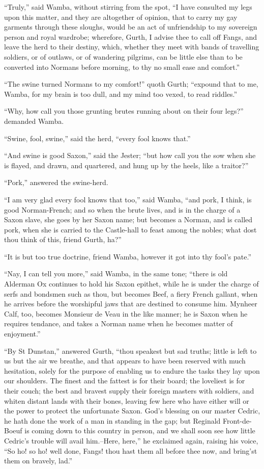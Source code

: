 ``Truly,'' said Wamba, without stirring from the spot, ``I have
consulted my legs upon this matter, and they are altogether of opinion,
that to carry my gay garments through these sloughs, would be an act of
unfriendship to my sovereign person and royal wardrobe; wherefore,
Gurth, I advise thee to call off Fangs, and leave the herd to their
destiny, which, whether they meet with bands of travelling soldiers, or
of outlaws, or of wandering pilgrims, can be little else than to be
converted into Normans before morning, to thy no small ease and
comfort.''

``The swine turned Normans to my comfort!'' quoth Gurth; ``expound that
to me, Wamba, for my brain is too dull, and my mind too vexed, to read
riddles.''

``Why, how call you those grunting brutes running about on their four
legs?'' demanded Wamba.

``Swine, fool, swine,'' said the herd, ``every fool knows that.''

``And swine is good Saxon,'' said the Jester; ``but how call you the sow
when she is flayed, and drawn, and quartered, and hung up by the heels,
like a traitor?''

``Pork,'' answered the swine-herd.

``I am very glad every fool knows that too,'' said Wamba, ``and pork, I
think, is good Norman-French; and so when the brute lives, and is in the
charge of a Saxon slave, she goes by her Saxon name; but becomes a
Norman, and is called pork, when she is carried to the Castle-hall to
feast among the nobles; what dost thou think of this, friend Gurth,
ha?''

``It is but too true doctrine, friend Wamba, however it got into thy
fool's pate.''

``Nay, I can tell you more,'' said Wamba, in the same tone; ``there is
old Alderman Ox continues to hold his Saxon epithet, while he is under
the charge of serfs and bondsmen such as thou, but becomes Beef, a fiery
French gallant, when he arrives before the worshipful jaws that are
destined to consume him. Mynheer Calf, too, becomes Monsieur de Veau in
the like manner; he is Saxon when he requires tendance, and takes a
Norman name when he becomes matter of enjoyment.''

``By St Dunstan,'' answered Gurth, ``thou speakest but sad truths;
little is left to us but the air we breathe, and that appears to have
been reserved with much hesitation, solely for the purpose of enabling
us to endure the tasks they lay upon our shoulders. The finest and the
fattest is for their board; the loveliest is for their couch; the best
and bravest supply their foreign masters with soldiers, and whiten
distant lands with their bones, leaving few here who have either will or
the power to protect the unfortunate Saxon. God's blessing on our master
Cedric, he hath done the work of a man in standing in the gap; but
Reginald Front-de-Boeuf is coming down to this country in person, and we
shall soon see how little Cedric's trouble will avail him.--Here,
here,'' he exclaimed again, raising his voice, ``So ho! so ho! well
done, Fangs! thou hast them all before thee now, and bring'st them on
bravely, lad.''

